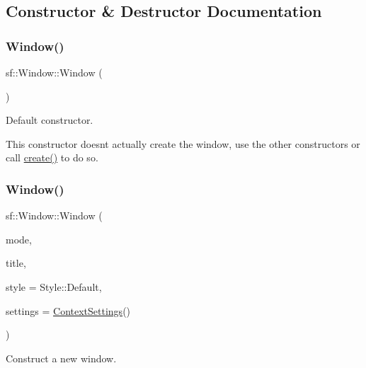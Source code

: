 \subsection{Constructor \& Destructor Documentation}
\mbox{\label{classsf_1_1_window_a5359122166b4dc492c3d25caf08ccfc4}} 
\subsubsection{\texorpdfstring{Window()}{Window()}\hspace{0.1cm}{\footnotesize\ttfamily [1/3]}}
{\footnotesize\ttfamily sf\+::\+Window\+::\+Window (\begin{DoxyParamCaption}{ }\end{DoxyParamCaption})}



Default constructor. 

This constructor doesn\textquotesingle{}t actually create the window, use the other constructors or call \hyperlink{classsf_1_1_window_a30e6edf2162f8dbff61023b9de5d961d}{create()} to do so. \mbox{\label{classsf_1_1_window_a1bee771baecbae6d357871929dc042a2}} 
\subsubsection{\texorpdfstring{Window()}{Window()}\hspace{0.1cm}{\footnotesize\ttfamily [2/3]}}
{\footnotesize\ttfamily sf\+::\+Window\+::\+Window (\begin{DoxyParamCaption}\item[{\hyperlink{classsf_1_1_video_mode}{Video\+Mode}}]{mode,  }\item[{const \hyperlink{classsf_1_1_string}{String} \&}]{title,  }\item[{Uint32}]{style = {\ttfamily Style\+:\+:Default},  }\item[{const \hyperlink{structsf_1_1_context_settings}{Context\+Settings} \&}]{settings = {\ttfamily \hyperlink{structsf_1_1_context_settings}{Context\+Settings}()} }\end{DoxyParamCaption})}



Construct a new window. 

